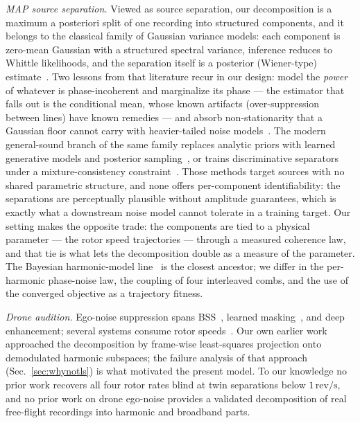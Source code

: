 \documentclass[journal]{IEEEtran}
\newcommand{\revps}{\ensuremath{\,\mathrm{rev/s}}}
\begin{document}
\emph{MAP source separation.} Viewed as source separation, our
decomposition is a maximum a posteriori split of one recording into
structured components, and it belongs to the classical family of
Gaussian variance models: each component is zero-mean Gaussian with a
structured spectral variance, inference reduces to Whittle likelihoods,
and the separation itself is a posterior (Wiener-type)
estimate~\cite{fevotte2009isnmf,duong2010fullrank,turner2014probtf}.
Two lessons from that literature recur in our design: model the
\emph{power} of whatever is phase-incoherent and marginalize its phase
--- the estimator that falls out is the conditional mean, whose known
artifacts (over-suppression between lines) have known remedies --- and
absorb non-stationarity that a Gaussian floor cannot carry with
heavier-tailed noise models~\cite{mogami2018ilrma}. The modern
general-sound branch of the same family replaces analytic priors with
learned generative models and posterior
sampling~\cite{jayaram2020basis,chung2023dps,scheibler2023diffsep,mariani2024msdm,lutati2024separatediffuse},
or trains discriminative separators under a mixture-consistency
constraint~\cite{wisdom2020mixit}. Those methods target sources with no
shared parametric structure, and none offers per-component
identifiability: the separations are perceptually plausible without
amplitude guarantees, which is exactly what a downstream noise model
cannot tolerate in a training target. Our setting makes the opposite
trade: the components are tied to a physical parameter --- the rotor
speed trajectories --- through a measured coherence law, and that tie is
what lets the decomposition double as a measure of the parameter. The
Bayesian harmonic-model
line~\cite{davy2006bayesharmonic,cemgil2006generative} is the closest
ancestor; we differ in the per-harmonic phase-noise law, the coupling of
four interleaved combs, and the use of the converged objective as a
trajectory fitness.

\emph{Drone audition.} Ego-noise suppression spans
BSS~\cite{wang2020bss}, learned masking~\cite{wang2020dnntf}, and deep
enhancement; several systems consume rotor
speeds~\cite{yen2023ncm,gulli2025rotorcond}. Our own earlier work
approached the decomposition by frame-wise least-squares projection onto
demodulated harmonic subspaces; the failure analysis of that approach
(Sec.~\ref{sec:whynotls}) is what motivated the present model. To our
knowledge no prior work recovers all four rotor rates blind at twin
separations below $1\revps$, and no prior work on drone ego-noise
provides a validated decomposition of real free-flight recordings into
harmonic and broadband parts.
\end{document}

